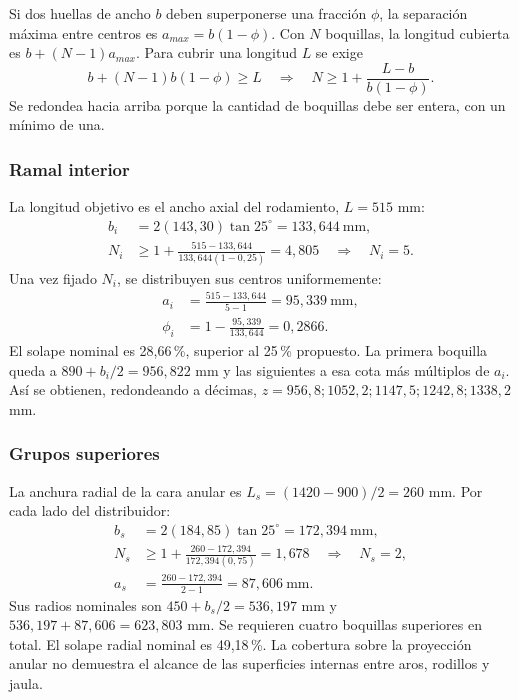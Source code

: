 Si dos huellas de ancho $b$ deben superponerse una fracción $\phi$, la
separación máxima entre centros es $a_{max}=b(1-\phi)$. Con $N$ boquillas,
la longitud cubierta es $b+(N-1)a_{max}$. Para cubrir una longitud $L$ se exige
\begin{equation}
 b+(N-1)b(1-\phi)\geq L
 \quad\Longrightarrow\quad
 N\geq1+\frac{L-b}{b(1-\phi)}.
 \label{eq:man-asp-n}
\end{equation}
Se redondea hacia arriba porque la cantidad de boquillas debe ser entera,
con un mínimo de una.

\subsubsection{Ramal interior}
La longitud objetivo es el ancho axial del rodamiento, $L=515$ mm:
\begin{align}
 b_i&=2(143{,}30)\tan25^\circ=133{,}644\ \mathrm{mm},\\
 N_i&\geq1+\frac{515-133{,}644}{133{,}644(1-0{,}25)}
 =4{,}805\quad\Longrightarrow\quad\boxed{N_i=5}.
\end{align}
Una vez fijado $N_i$, se distribuyen sus centros uniformemente:
\begin{align}
 a_i&=\frac{515-133{,}644}{5-1}=95{,}339\ \mathrm{mm},\\
 \phi_i&=1-\frac{95{,}339}{133{,}644}=0{,}2866.
\end{align}
El solape nominal es 28,66\,\%, superior al 25\,\% propuesto.
La primera boquilla queda a $890+b_i/2=956{,}822$ mm y las siguientes
a esa cota más múltiplos de $a_i$. Así se obtienen, redondeando a décimas,
$z=956{,}8;1052{,}2;1147{,}5;1242{,}8;1338{,}2$ mm.

\subsubsection{Grupos superiores}
La anchura radial de la cara anular es
$L_s=(1420-900)/2=260$ mm. Por cada lado del distribuidor:
\begin{align}
 b_s&=2(184{,}85)\tan25^\circ=172{,}394\ \mathrm{mm},\\
 N_s&\geq1+\frac{260-172{,}394}{172{,}394(0{,}75)}
 =1{,}678\quad\Longrightarrow\quad\boxed{N_s=2},\\
 a_s&=\frac{260-172{,}394}{2-1}=87{,}606\ \mathrm{mm}.
\end{align}
Sus radios nominales son $450+b_s/2=536{,}197$ mm y
$536{,}197+87{,}606=623{,}803$ mm. Se requieren cuatro boquillas
superiores en total. El solape radial nominal es 49,18\,\%.
La cobertura sobre la proyección anular no demuestra el alcance de las
superficies internas entre aros, rodillos y jaula.


